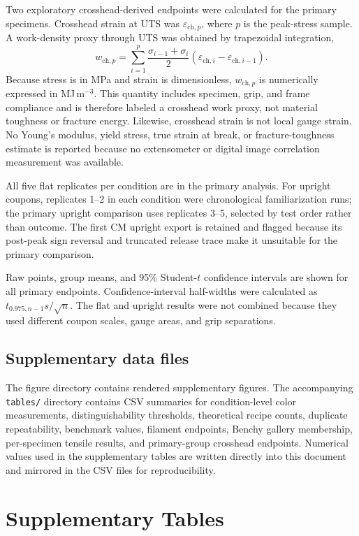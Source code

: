 \documentclass[preprint,12pt,authoryear]{elsarticle}
\begin{document}
Two exploratory crosshead-derived endpoints were calculated for the primary specimens. Crosshead strain at UTS was \(\varepsilon_{\mathrm{ch},p}\), where \(p\) is the peak-stress sample. A work-density proxy through UTS was obtained by trapezoidal integration,
\[
w_{\mathrm{ch},p}
=
\sum_{i=1}^{p}
\frac{\sigma_{i-1}+\sigma_i}{2}
\left(\varepsilon_{\mathrm{ch},i}-\varepsilon_{\mathrm{ch},i-1}\right).
\]
Because stress is in MPa and strain is dimensionless, \(w_{\mathrm{ch},p}\) is numerically expressed in MJ\,m\(^{-3}\). This quantity includes specimen, grip, and frame compliance and is therefore labeled a crosshead work proxy, not material toughness or fracture energy. Likewise, crosshead strain is not local gauge strain. No Young's modulus, yield stress, true strain at break, or fracture-toughness estimate is reported because no extensometer or digital image correlation measurement was available.

All five flat replicates per condition are in the primary analysis. For upright coupons, replicates 1--2 in each condition were chronological familiarization runs; the primary upright comparison uses replicates 3--5, selected by test order rather than outcome. The first CM upright export is retained and flagged because its post-peak sign reversal and truncated release trace make it unsuitable for the primary comparison.

Raw points, group means, and 95\% Student-\(t\) confidence intervals are shown for all primary endpoints. Confidence-interval half-widths were calculated as \(t_{0.975,n-1}s/\sqrt{n}\). The flat and upright results were not combined because they used different coupon scales, gauge areas, and grip separations.

\subsection*{Supplementary data files}

The figure directory contains rendered supplementary figures. The accompanying \texttt{tables/} directory contains CSV summaries for condition-level color measurements, distinguishability thresholds, theoretical recipe counts, duplicate repeatability, benchmark values, filament endpoints, Benchy gallery membership, per-specimen tensile results, and primary-group crosshead endpoints. Numerical values used in the supplementary tables are written directly into this document and mirrored in the CSV files for reproducibility.

\section*{Supplementary Tables}
\end{document}
